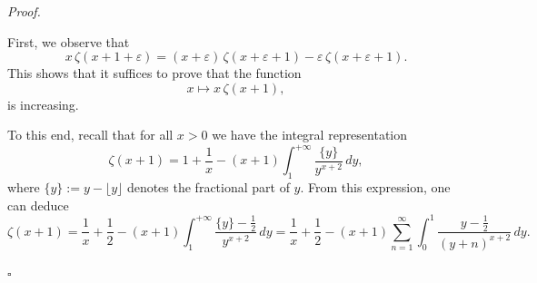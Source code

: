 \documentclass[10pt]{article}
\renewenvironment{proof}[1][Proof]{%
  \noindent\textit{#1. }%
}{\hfill$\square$\vspace{4pt}}
\begin{document}
\begin{proof}
First, we observe that
\[
x\, \zeta(x + 1 + \varepsilon) = (x + \varepsilon)\, \zeta(x + \varepsilon + 1) - \varepsilon \, \zeta(x + \varepsilon + 1).
\]
This shows that it suffices to prove that the function
\[
x \longmapsto x \, \zeta(x + 1),
\]
is increasing.  

To this end, recall that for all $x > 0$ we have the integral representation
\begin{equation} \label{eq:zeta_integral}
\zeta(x + 1) = 1 + \frac{1}{x} - (x + 1) \int_1^{+\infty} \frac{\{y\}}{y^{x+2}} \, dy,
\end{equation}
where $\{y\} := y - \lfloor y \rfloor$ denotes the fractional part of $y$. From this expression, one can deduce
\[
\zeta(x + 1) = \frac{1}{x} + \frac{1}{2} - (x + 1) \int_1^{+\infty} \frac{\{y\} - \frac{1}{2}}{y^{x+2}} \, dy=\frac{1}{x} + \frac{1}{2} - (x + 1) \sum_{n=1}^{\infty}\int_0^{1} \frac{y - \frac{1}{2}}{(y+n)^{x+2}} \, dy.
\]


\end{proof}
\end{document}
